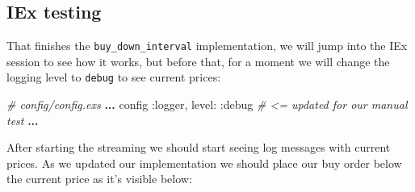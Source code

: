 \documentclass[
  oneside]{book}
\newenvironment{Shaded}{\begin{snugshade}}{\end{snugshade}}
\newcommand{\AttributeTok}[1]{\textcolor[rgb]{0.13,0.29,0.53}{#1}}
\newcommand{\CommentTok}[1]{\textcolor[rgb]{0.56,0.35,0.01}{\textit{#1}}}
\newcommand{\ErrorTok}[1]{\textcolor[rgb]{0.64,0.00,0.00}{\textbf{#1}}}
\newcommand{\ExtensionTok}[1]{#1}
\newcommand{\KeywordTok}[1]{\textcolor[rgb]{0.13,0.29,0.53}{\textbf{#1}}}
\newcommand{\NormalTok}[1]{#1}
\newcommand{\OperatorTok}[1]{\textcolor[rgb]{0.81,0.36,0.00}{\textbf{#1}}}
\newcommand{\PreprocessorTok}[1]{\textcolor[rgb]{0.56,0.35,0.01}{\textit{#1}}}
\newcommand{\SpecialStringTok}[1]{\textcolor[rgb]{0.31,0.60,0.02}{#1}}
\newcommand{\StringTok}[1]{\textcolor[rgb]{0.31,0.60,0.02}{#1}}
\newcommand{\VariableTok}[1]{\textcolor[rgb]{0.00,0.00,0.00}{#1}}
\begin{document}
\subsection{IEx testing}\label{iex-testing-1}

That finishes the \texttt{buy\_down\_interval} implementation, we will jump into the IEx session to see how it works, but before that, for a moment we will change the logging level to \texttt{debug} to see current prices:

\begin{Shaded}
\begin{Highlighting}[]
\CommentTok{\# config/config.exs}
\OperatorTok{...}
\NormalTok{config }\VariableTok{:logger}\NormalTok{,}
  \VariableTok{level:} \VariableTok{:debug} \CommentTok{\# \textless{}= updated for our manual test}
\OperatorTok{...}
\end{Highlighting}
\end{Shaded}

\newpage

After starting the streaming we should start seeing log messages with current prices. As we updated our implementation we should place our buy order below the current price as it's visible below:

\begin{Shaded}
\end{Shaded}
\end{document}
